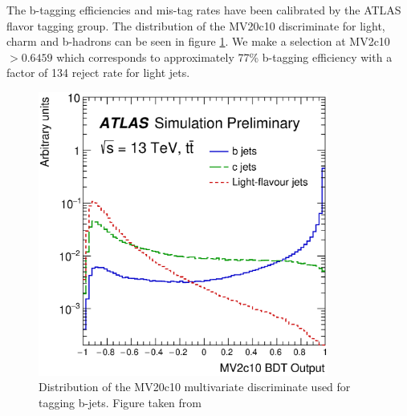 \indent The b-tagging efficiencies and mis-tag rates have been calibrated by the ATLAS flavor tagging group.  The distribution of the MV20c10 discriminate for light, charm and b-hadrons can be seen in figure \ref{fig:MV20c10}. We make a selection at MV2c10 $ > 0.6459$ which corresponds to approximately 77\% b-tagging efficiency with a factor of 134 reject rate for light jets.  \\

\begin{figure}[htb]
  \begin{center}
    \includegraphics[width=0.85\textwidth]{figures/JetCalib/MV20c10.eps}\hspace{0.05\textwidth}
\end{center}
\caption{Distribution of the MV20c10 multivariate discriminate used for tagging b-jets.  Figure taken from \cite{btagging2016}  }
\label{fig:MV20c10} 
\end{figure}
